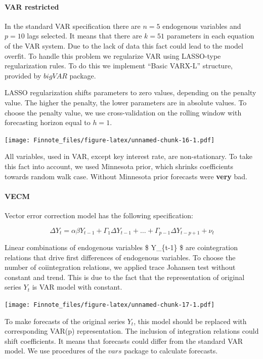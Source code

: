 \documentclass[
]{article}
\begin{document}
\hypertarget{var-restricted}{%
\paragraph{VAR restricted}\label{var-restricted}}

In the standard VAR specification there are \(n=5\) endogenous variables
and \(p=10\) lags selected. It means that there are \(k=51\) parameters
in each equation of the VAR system. Due to the lack of data this fact
could lead to the model overfit. To handle this problem we regularize
VAR using LASSO-type regularization rules. To do this we implement
``Basic VARX-L'' structure, provided by \(bigVAR\) package.

LASSO regularization shifts parameters to zero values, depending on the
penalty value. The higher the penalty, the lower parameters are in
absolute values. To choose the penalty value, we use cross-validation on
the rolling window with forecasting horizon equal to \(h=1\).

\texttt{[image: Finnote\_files/figure-latex/unnamed-chunk-16-1.pdf]}

All variables, used in VAR, except key interest rate, are
non-stationary. To take this fact into account, we used Minnesota prior,
which shrinks coefficients towards random walk case. Without Minnesota
prior forecasts were \textbf{very} bad.

\hypertarget{vecm}{%
\paragraph{VECM}\label{vecm}}

Vector error correction model has the following specification:

\[
\Delta Y_t =  \alpha \beta Y_{t-1} + \Gamma_1 \Delta Y_{t-1} + \ldots +\Gamma_{p-1} \Delta Y_{t-p+1} +\nu_t
\]

Linear combinations of endogenous variables \$ \beta \times Y\_\{t-1\}
\$ are cointegration relations that drive first differences of
endogenous variables. To choose the number of coiintegration relations,
we applied trace Johansen test without constant and trend. This is due
to the fact that the representation of original series \(Y_t\) is VAR
model with constant.

\texttt{[image: Finnote\_files/figure-latex/unnamed-chunk-17-1.pdf]}

To make forecasts of the original series \(Y_t\), this model should be
replaced with corresponding VAR(p) representation. The inclusion of
integration relations could shift coefficients. It means that forecasts
could differ from the standard VAR model. We use procedures of the
\(vars\) package to calculate forecasts.
\end{document}
